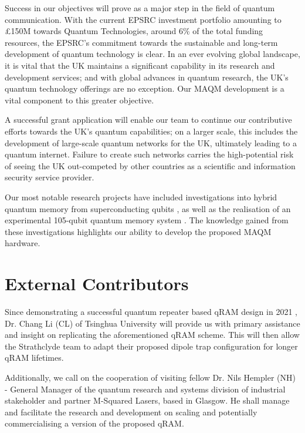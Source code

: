 \documentclass{epsrc}
\begin{document}
Success in our objectives will prove as a major step in the field of quantum communication. With the current EPSRC investment portfolio amounting to £150M towards Quantum Technologies, around 6\% of the total funding resources, the EPSRC's commitment towards the sustainable and long-term development of quantum technology is clear. In an ever evolving global landscape, it is vital that the UK maintains a significant capability in its research and development services; and with global advances in quantum research, the UK's quantum technology offerings are no exception. Our MAQM development is a vital component to this greater objective.  

A successful grant application will enable our team to continue our contributive efforts towards the UK's quantum capabilities; on a larger scale, this includes the development of large-scale quantum networks for the UK, ultimately leading to a quantum internet. Failure to create such networks carries the high-potential risk of seeing the UK out-competed by other countries as a scientific and information security service provider.

Our most notable research projects have included investigations into hybrid quantum memory from superconducting qubits , as well as the realisation of an experimental 105-qubit quantum memory system . The knowledge gained from these investigations highlights our ability to develop the proposed MAQM hardware.

\vspace{16pt}

\section{External Contributors}

Since demonstrating a successful quantum repeater based qRAM design in 2021 , Dr. Chang Li (CL) of Tsinghua University will provide us with primary assistance and insight on replicating the aforementioned qRAM scheme. This will then allow the Strathclyde team to adapt their proposed dipole trap configuration for longer qRAM lifetimes. 

Additionally, we call on the cooperation of visiting fellow Dr. Nils Hempler (NH) - General Manager of the quantum research and systems division of industrial stakeholder and partner M-Squared Lasers, based in Glasgow. He shall manage and facilitate the research and development on scaling and potentially commercialising a version of the proposed qRAM. 
\end{document}
